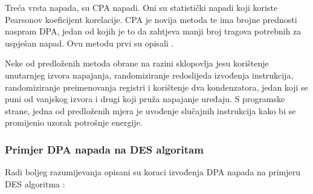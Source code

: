 \documentclass[times, utf8, diplomski]{fer}
\begin{document}
Treća vrsta napada, su CPA napadi. Oni su statistički napadi koji koriste Pearsonov koeficijent korelacije. CPA je novija metoda te ima brojne prednosti naspram DPA, jedan od kojih je to da zahtjeva manji broj tragova potrebnih za uspješan napad. Ovu metodu prvi su opisali \cite{brier2004correlation}.

Neke od predloženih metoda obrane na razini sklopovlja jesu korištenje unutarnjeg izvora napajanja, randomiziranje redoslijeda izvođenja instrukcija, randomiziranje preimenovanja registri i korištenje dva kondenzatora, jedan koji se puni od vanjskog izvora i drugi koji pruža napajanje uređaju. S programske strane, jedna od predloženih mjera je uvođenje slučajnih instrukcija kako bi se promijenio uzorak potrošnje energije.

\subsubsection{Primjer DPA napada na DES algoritam}

Radi boljeg razumijevanja opisani su koraci izvođenja DPA napada na primjeru DES algoritma \citep{standaert2010introduction}:
\end{document}
